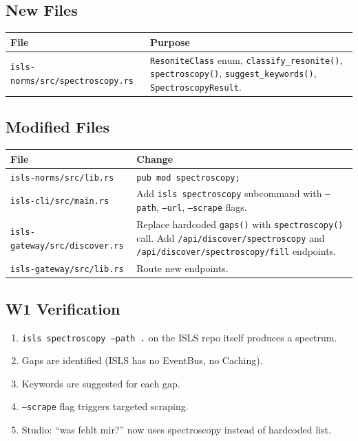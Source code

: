 \documentclass[11pt,a4paper]{article}
\begin{document}
\subsection{New Files}

\begin{longtable}{lp{10cm}}
\toprule
\textbf{File} & \textbf{Purpose} \\
\midrule
\texttt{isls-norms/src/spectroscopy.rs}
  & \texttt{ResoniteClass} enum, \texttt{classify\_resonite()}, 
    \texttt{spectroscopy()}, \texttt{suggest\_keywords()}, 
    \texttt{SpectroscopyResult}. \\
\bottomrule
\end{longtable}

\subsection{Modified Files}

\begin{longtable}{lp{10cm}}
\toprule
\textbf{File} & \textbf{Change} \\
\midrule
\texttt{isls-norms/src/lib.rs}
  & \texttt{pub mod spectroscopy;} \\
\texttt{isls-cli/src/main.rs}
  & Add \texttt{isls spectroscopy} subcommand with 
    \texttt{--path}, \texttt{--url}, \texttt{--scrape} flags. \\
\texttt{isls-gateway/src/discover.rs}
  & Replace hardcoded \texttt{gaps()} with 
    \texttt{spectroscopy()} call. Add 
    \texttt{/api/discover/spectroscopy} and 
    \texttt{/api/discover/spectroscopy/fill} endpoints. \\
\texttt{isls-gateway/src/lib.rs}
  & Route new endpoints. \\
\bottomrule
\end{longtable}

\subsection{W1 Verification}

\begin{enumerate}[nosep]
\item \texttt{isls spectroscopy --path .} on the ISLS repo 
      itself produces a spectrum.
\item Gaps are identified (ISLS has no EventBus, no Caching).
\item Keywords are suggested for each gap.
\item \texttt{--scrape} flag triggers targeted scraping.
\item Studio: ``was fehlt mir?'' now uses spectroscopy instead 
      of hardcoded list.
\end{enumerate}
\end{document}
